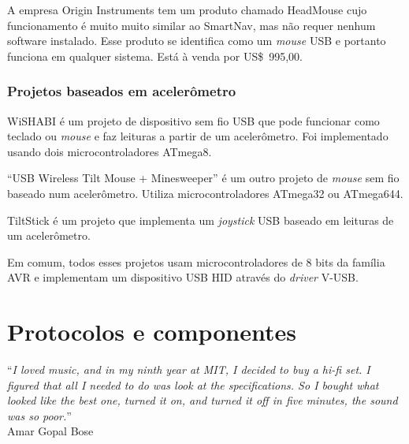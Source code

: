 \documentclass[brazil,pagestart=firstchapter]{abnt}
\begin{document}
A empresa Origin Instruments tem um produto chamado HeadMouse
\cite{HeadMouse} cujo funcionamento é muito muito similar ao SmartNav, mas
não requer nenhum software instalado. Esse produto se identifica como um
\textit{mouse} \acs{USB} e portanto funciona em qualquer sistema. Está à
venda por US\$~995,00.


\subsection{Projetos baseados em acelerômetro}
\label{sub:acelerometro}

WiSHABI \cite{WiSHABI} é um projeto de dispositivo sem fio \acs{USB} que
pode funcionar como teclado ou \textit{mouse} e faz leituras a partir de um
acelerômetro. Foi implementado usando dois microcontroladores ATmega8.

``USB Wireless Tilt Mouse + Minesweeper'' \cite{USBWirelessTiltMouse} é um
outro projeto de \textit{mouse} sem fio baseado num acelerômetro. Utiliza
microcontroladores ATmega32 ou ATmega644.

TiltStick \cite{TiltStick} é um projeto que implementa um \textit{joystick}
\acs{USB} baseado em leituras de um acelerômetro.

Em comum, todos esses projetos usam microcontroladores de 8 bits da família
AVR e implementam um dispositivo \acs{USB} \acs{HID} através do
\textit{driver} V-USB.



%
%



\chapter{Protocolos e componentes}
\label{cap:protocolos_e_componentes}


\vfill{}
\begin{flushright}{}
``\emph{I loved music, and in my ninth year at MIT, I decided to buy a hi-fi
set. I figured that all I needed to do was look at the specifications. So I
bought what looked like the best one, turned it on, and turned it off in
five minutes, the sound was so poor.}''\\
{\small Amar Gopal Bose}
\end{flushright}{\small \par}
\vfill{}
\end{document}
